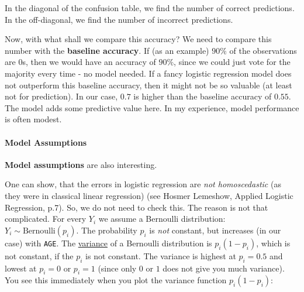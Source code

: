\documentclass[
]{article}
\begin{document}
In the diagonal of the confusion table, we find the number of correct
predictions. In the off-diagonal, we find the number of incorrect
predictions.

Now, with what shall we compare this accuracy? We need to compare this
number with the \textbf{baseline accuracy}. If (as an example) \(90\%\)
of the observations are \(0\)s, then we would have an accuracy of
\(90\%\), since we could just vote for the majority every time - no
model needed. If a fancy logistic regression model does not outperform
this baseline accuracy, then it might not be so valuable (at least not
for prediction). In our case, \(0.7\) is higher than the baseline
accuracy of \(0.55\). The model adds some predictive value here. In my
experience, model performance is often modest.

\paragraph{Model Assumptions}\label{model_assumptions}

\textbf{Model assumptions} are also interesting.

One can show, that the errors in logistic regression are \emph{not
homoscedastic} (as they were in classical linear regression) (see Hosmer
Lemeshow, Applied Logistic Regression, p.7). So, we do not need to check
this. The reason is not that complicated. For every \(Y_i\) we assume a
Bernoulli distribution: \(Y_i \sim \text{Bernoulli}(p_i)\). The
probability \(p_i\) is \emph{not} constant, but increases (in our case)
with \texttt{AGE}. The
\href{https://en.wikipedia.org/wiki/Bernoulli_distribution\#Variance}{variance}
of a Bernoulli distribution is \(p_i(1-p_i)\), which is not constant, if
the \(p_i\) is not constant. The variance is highest at \(p_i = 0.5\)
and lowest at \(p_i = 0\) or \(p_i = 1\) (since only \(0\) or \(1\) does
not give you much variance). You see this immediately when you plot the
variance function \(p_i(1-p_i)\):
\end{document}

